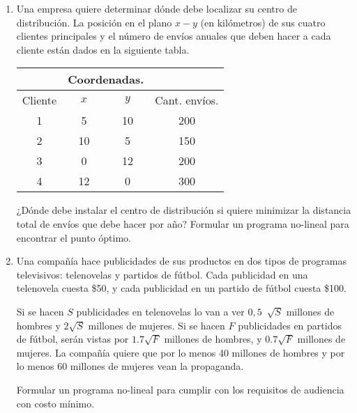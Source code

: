 \documentclass[12pt]{article}
\begin{document}
\begin{center}
\begin{enumerate}
            \item Una empresa quiere determinar dónde debe localizar su centro de distribución. La posición en el plano $x-y$ (en kilómetros) de sus cuatro clientes principales y el número de envíos anuales que deben hacer a cada cliente están dados en la siguiente tabla. 
            \begin{center}
                \begin{adjustbox}{width = 0.50 \textwidth}
                  \begin{tabular}{|c |c | c | c|}
                    \hline
                     & \multicolumn{2}{|c|}{ Coordenadas.} & \\
                     \hline 
                     Cliente & $x$ & $y$ & Cant. envíos. \\
                     \hline 
                     1 & 5 & 10 & 200 \\
                     2 & 10 & 5 & 150 \\
                     3 & 0 & 12 & 200 \\
                     4 & 12 & 0 & 300 \\
                    \hline 
                  \end{tabular}
                \end{adjustbox}
             \end{center}

            ¿Dónde debe instalar el centro de distribución si quiere minimizar la distancia total de envíos que debe hacer por año? 
            Formular un programa no-lineal para encontrar el punto óptimo. 
            
            \item Una compañía hace publicidades de sus productos en dos tipos de programas televisivos:
            telenovelas y partidos de fútbol. Cada publicidad en una telenovela cuesta \$50, y cada publicidad en un partido de fútbol cuesta \$100. 

            Si se hacen $S$ publicidades en telenovelas lo van a ver $0,5 \  \sqrt[]{S}$ millones de hombres y $2\sqrt{S}$ millones de mujeres. 
            Si se hacen $F$ publicidades en partidos de fútbol, serán vistas por $1. 7 \sqrt{F}$ millones de hombres, y $0.7 \sqrt{F}$ millones de mujeres. 
            La compañía quiere que por lo menos 40 millones de hombres y por lo menos 60
            millones de mujeres vean la propaganda. 

            Formular un programa no-lineal para cumplir con
            los requisitos de audiencia con costo mínimo. 


\end{enumerate}
\end{center}
\end{document}
